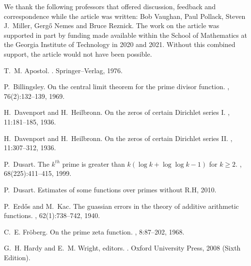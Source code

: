 \documentclass[11pt,reqno,a4letter]{article}
\numberwithin{figure}{section}
\numberwithin{table}{section}
\theoremstyle{plain}
\numberwithin{theorem}{section}
\theoremstyle{definition}
\begin{document}
We thank the following professors that offered 
discussion, feedback and correspondence while the article was written: 
Bob Vaughan, Paul Pollack, Steven J.~Miller, Gerg\H{o} Nemes and Bruce Reznick. 
The work on the article was supported in part by 
funding made available within the School of Mathematics at the 
Georgia Institute of Technology in 2020 and 2021. 
Without this combined support, the article would not have been possible.

\newpage 
\renewcommand{\refname}{References} 


\begin{thebibliography}{10}

T.~M. Apostol.
.
\newblock Springer--Verlag, 1976.

P.~Billingsley.
\newblock On the central limit theorem for the prime divisor function.
, 76(2):132--139, 1969.

H.~Davenport and H.~Heilbronn.
\newblock On the zeros of certain {D}irichlet series {I}.
, 11:181--185, 1936.

H.~Davenport and H.~Heilbronn.
\newblock On the zeros of certain {D}irichlet series {II}.
, 11:307--312, 1936.

P.~Dusart.
\newblock The $k^{th}$ prime is greater than $k(\log k +\log\log k-1)$ for $k
  \geq 2$.
, 68(225):411--415, 1999.

P.~Dusart.
\newblock Estimates of some functions over primes without {R}.{H}, 2010.

P.~Erd{\H{o}}s and M.~Kac.
\newblock The guassian errors in the theory of additive arithmetic functions.
, 62(1):738--742, 1940.

C.~E. Fr{\"{o}}berg.
\newblock On the prime zeta function.
, 8:87--202, 1968.

G.~H. Hardy and E.~M. Wright, editors.
.
\newblock Oxford University Press, 2008 (Sixth Edition).


\end{thebibliography}
\end{document}
